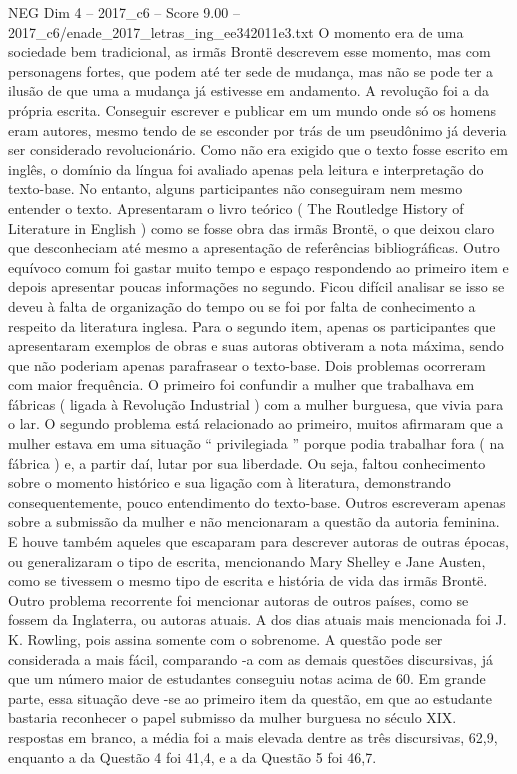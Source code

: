 \begin{textsample}{NEG Dim 4 – 2017\_c6 – Score 9.00 – 2017\_c6/enade\_2017\_letras\_ing\_ee342011e3.txt}
O momento era de uma sociedade bem tradicional, as irmãs Brontë descrevem esse momento, mas com personagens fortes, que podem até ter sede de mudança, mas não se pode ter a ilusão de que uma a mudança já estivesse em andamento.
A revolução foi a da própria escrita.
Conseguir escrever e publicar em um mundo onde só os homens eram autores, mesmo tendo de se esconder por trás de um pseudônimo já deveria ser considerado revolucionário.
Como não era exigido que o texto fosse escrito em inglês, o domínio da língua foi avaliado apenas pela leitura e interpretação do texto-base.
No entanto, alguns participantes não conseguiram nem mesmo entender o texto.
Apresentaram o livro teórico ( The Routledge History of Literature in English ) como se fosse obra das irmãs Brontë, o que deixou claro que desconheciam até mesmo a apresentação de referências bibliográficas.
Outro equívoco comum foi gastar muito tempo e espaço respondendo ao primeiro item e depois apresentar poucas informações no segundo.
Ficou difícil analisar se isso se deveu à falta de organização do tempo ou se foi por falta de conhecimento a respeito da literatura inglesa.
Para o segundo item, apenas os participantes que apresentaram exemplos de obras e suas autoras obtiveram a nota máxima, sendo que não poderiam apenas parafrasear o texto-base.
Dois problemas ocorreram com maior frequência.
O primeiro foi confundir a mulher que trabalhava em fábricas ( ligada à Revolução Industrial ) com a mulher burguesa, que vivia para o lar.
O segundo problema está relacionado ao primeiro, muitos afirmaram que a mulher estava em uma situação “ privilegiada ” porque podia trabalhar fora ( na fábrica ) e, a partir daí, lutar por sua liberdade.
Ou seja, faltou conhecimento sobre o momento histórico e sua ligação com à literatura, demonstrando consequentemente, pouco entendimento do texto-base.
Outros escreveram apenas sobre a submissão da mulher e não mencionaram a questão da autoria feminina.
E houve também aqueles que escaparam para descrever autoras de outras épocas, ou generalizaram o tipo de escrita, mencionando Mary Shelley e Jane Austen, como se tivessem o mesmo tipo de escrita e história de vida das irmãs Brontë.
Outro problema recorrente foi mencionar autoras de outros países, como se fossem da Inglaterra, ou autoras atuais.
A dos dias atuais mais mencionada foi J.
K.
Rowling, pois assina somente com o sobrenome.
A questão pode ser considerada a mais fácil, comparando -a com as demais questões discursivas, já que um número maior de estudantes conseguiu notas acima de 60.
Em grande parte, essa situação deve -se ao primeiro item da questão, em que ao estudante bastaria reconhecer o papel submisso da mulher burguesa no século XIX. respostas em branco, a média foi a mais elevada dentre as três discursivas, 62,9, enquanto a da Questão 4 foi 41,4, e a da Questão 5 foi 46,7.

\end{textsample}
